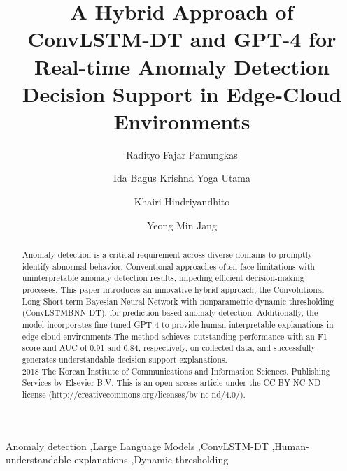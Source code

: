 \documentclass[final,3p,times,twocolumn]{elsarticle}
\begin{document}
\begin{frontmatter}

\title{A Hybrid Approach of ConvLSTM-DT and GPT-4 for Real-time Anomaly Detection Decision Support in Edge-Cloud Environments}
\author{Radityo Fajar Pamungkas}

\author{Ida Bagus Krishna Yoga Utama}

\author{Khairi Hindriyandhito}

\author{Yeong Min Jang}
\address{Department of Electronics Engineering, Kookmin University, Seoul, South Korea}


\begin{abstract}

Anomaly detection is a critical requirement across diverse domains to promptly identify abnormal behavior. Conventional approaches often face limitations with uninterpretable anomaly detection results, impeding efficient decision-making processes. This paper introduces an innovative hybrid approach, the Convolutional Long Short-term Bayesian Neural Network with nonparametric dynamic thresholding (ConvLSTMBNN-DT), for prediction-based anomaly detection. Additionally, the model incorporates fine-tuned GPT-4 to provide human-interpretable explanations in edge-cloud environments.The method achieves outstanding performance with an F1-score and AUC of 0.91 and 0.84, respectively, on collected data, and successfully generates understandable decision support explanations.
\\
2018 The Korean Institute of Communications and Information Sciences. Publishing Services by Elsevier B.V. This is an open access article under the CC BY-NC-ND license (http://creativecommons.org/licenses/by-nc-nd/4.0/).
\end{abstract}

\begin{keyword}
Anomaly detection \sep Large Language Models \sep ConvLSTM-DT \sep Human-understandable explanations \sep Dynamic thresholding
\end{keyword}

\end{frontmatter}
\end{document}
